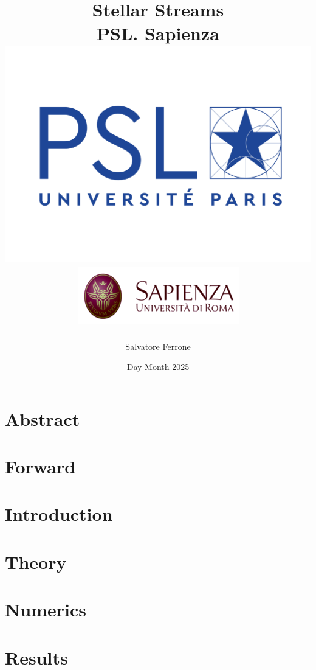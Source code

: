 \documentclass[12pt]{report}
\title{
{Stellar Streams}\\
{\large PSL. Sapienza}\\
{\includegraphics[width=0.5\linewidth]{LOGO-PSL-nov-2017.png}}
{\includegraphics[width=0.6\linewidth]{Uniroma1.png}}
}
\author{Salvatore Ferrone}
\date{Day Month 2025}
\begin{document}
\maketitle

\chapter*{Abstract}


\chapter*{Forward}


\tableofcontents

\chapter{Introduction}


\chapter{Theory}


\chapter{Numerics}
% 

\chapter{Results}
% 




\end{document}
